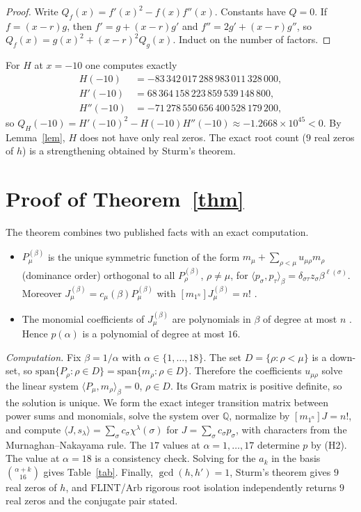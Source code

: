 \documentclass[11pt]{article}
\theoremstyle{remark}
\begin{document}
\begin{proof}
Write $Q_f(x)=f'(x)^2-f(x)f''(x)$. Constants have $Q=0$. If $f=(x-r)g$, then $f'=g+(x-r)g'$ and
$f''=2g'+(x-r)g''$, so $Q_f(x)=g(x)^2+(x-r)^2Q_g(x)$. Induct on the number of factors.
\end{proof}

For $H$ at $x=-10$ one computes exactly
\begin{align*}
H(-10)&=-83\,342\,017\,288\,983\,011\,328\,000,\\
H'(-10)&=68\,364\,158\,223\,859\,539\,148\,800,\\
H''(-10)&=-71\,278\,550\,656\,400\,528\,179\,200,
\end{align*}
so $Q_H(-10)=H'(-10)^2-H(-10)H''(-10)\approx-1.2668\times10^{45}<0$. By Lemma~\ref{lem}, $H$ does not have only
real zeros. The exact root count ($9$ real zeros of $h$) is a strengthening obtained by Sturm's theorem.

\section{Proof of Theorem~\ref{thm}}

The theorem combines two published facts with an exact computation.
\begin{itemize}
\item[(H1)] $P_\mu^{(\beta)}$ is the unique symmetric function of the form $m_\mu+\sum_{\rho<\mu}u_{\mu\rho}m_\rho$
(dominance order) orthogonal to all $P_\rho^{(\beta)}$, $\rho\neq\mu$, for
$\langle p_\sigma,p_\tau\rangle_\beta=\delta_{\sigma\tau}z_\sigma\beta^{\ell(\sigma)}$. Moreover
$J_\mu^{(\beta)}=c_\mu(\beta)P_\mu^{(\beta)}$ with $[m_{1^n}]J_\mu^{(\beta)}=n!$ \cite{Mac,Sta}.
\item[(H2)] The monomial coefficients of $J_\mu^{(\beta)}$ are polynomials in $\beta$ of degree at most $n$
\cite{KS97}. Hence $p(\alpha)$ is a polynomial of degree at most $16$.
\end{itemize}

\emph{Computation.} Fix $\beta=1/\alpha$ with $\alpha\in\{1,\dots,18\}$. The set $D=\{\rho:\rho<\mu\}$ is a
down-set, so $\mathrm{span}\{P_\rho:\rho\in D\}=\mathrm{span}\{m_\rho:\rho\in D\}$. Therefore the coefficients
$u_{\mu\rho}$ solve the linear system $\langle P_\mu,m_\rho\rangle_\beta=0$, $\rho\in D$. Its Gram matrix is
positive definite, so the solution is unique. We form the exact integer transition matrix between power sums and
monomials, solve the system over $\mathbb Q$, normalize by $[m_{1^n}]J=n!$, and compute
$\langle J,s_\lambda\rangle=\sum_\sigma c_\sigma\chi^\lambda(\sigma)$ for $J=\sum_\sigma c_\sigma p_\sigma$, with
characters from the Murnaghan--Nakayama rule. The $17$ values at $\alpha=1,\dots,17$ determine $p$ by (H2).
The value at $\alpha=18$ is a consistency check. Solving for the $a_k$ in the basis $\binom{\alpha+k}{16}$ gives
Table~\ref{tab}. Finally, $\gcd(h,h')=1$, Sturm's theorem gives $9$ real zeros of $h$, and FLINT/Arb rigorous
root isolation independently returns $9$ real zeros and the conjugate pair stated.
\end{document}
